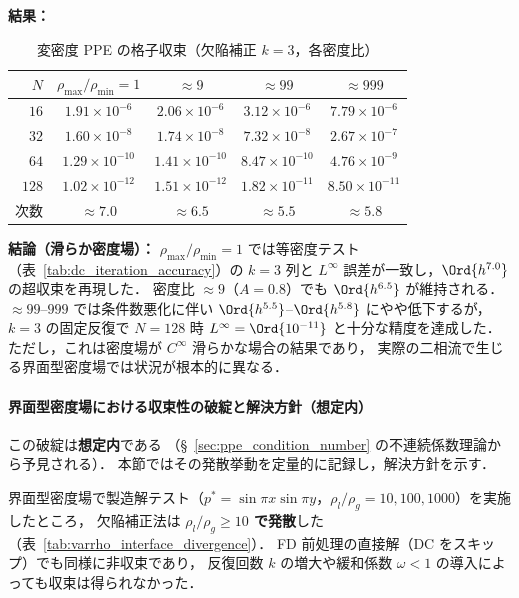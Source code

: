 \noindent\textbf{結果：}

\begin{table}[htbp]
\centering
\small
\caption{変密度 PPE の格子収束（欠陥補正 $k=3$，各密度比）}
\label{tab:ppe_varrho}
\renewcommand{\arraystretch}{1.3}
\begin{tabular}{rcccc}
\toprule
$N$ & $\rho_{\max}/\rho_{\min} = 1$ & $\approx 9$ & $\approx 99$ & $\approx 999$ \\
\midrule
$16$  & $1.91 \times 10^{-6}$ & $2.06 \times 10^{-6}$ & $3.12 \times 10^{-6}$ & $7.79 \times 10^{-6}$ \\
$32$  & $1.60 \times 10^{-8}$ & $1.74 \times 10^{-8}$ & $7.32 \times 10^{-8}$ & $2.67 \times 10^{-7}$ \\
$64$  & $1.29 \times 10^{-10}$ & $1.41 \times 10^{-10}$ & $8.47 \times 10^{-10}$ & $4.76 \times 10^{-9}$ \\
$128$ & $1.02 \times 10^{-12}$ & $1.51 \times 10^{-12}$ & $1.82 \times 10^{-11}$ & $8.50 \times 10^{-11}$ \\
\midrule
次数  & $\approx 7.0$ & $\approx 6.5$ & $\approx 5.5$ & $\approx 5.8$ \\
\bottomrule
\end{tabular}
\end{table}

\noindent\textbf{結論（滑らか密度場）：}
$\rho_{\max}/\rho_{\min} = 1$ では等密度テスト（表~\ref{tab:dc_iteration_accuracy}）の $k=3$ 列と
$L^\infty$ 誤差が一致し，$\Ord{h^{7.0}}$ の超収束を再現した．
密度比 $\approx 9$（$A = 0.8$）でも $\Ord{h^{6.5}}$ が維持される．
$\approx 99$--$999$ では条件数悪化に伴い $\Ord{h^{5.5}}$--$\Ord{h^{5.8}}$ にやや低下するが，
$k = 3$ の固定反復で $N = 128$ 時 $L^\infty = \Ord{10^{-11}}$ と十分な精度を達成した．
ただし，これは密度場が $C^\infty$ 滑らかな場合の結果であり，
実際の二相流で生じる界面型密度場では状況が根本的に異なる．

\paragraph{界面型密度場における収束性の破綻と解決方針（想定内）}
\label{sec:varrho_ppe_limitation}

この破綻は\textbf{想定内}である
（§~\ref{sec:ppe_condition_number} の不連続係数理論から予見される）．
本節ではその発散挙動を定量的に記録し，解決方針を示す．

界面型密度場で製造解テスト（$p^* = \sin\pi x\sin\pi y$，$\rho_l/\rho_g = 10, 100, 1000$）を実施したところ，
欠陥補正法は \textbf{$\rho_l/\rho_g \geq 10$ で発散}した（表~\ref{tab:varrho_interface_divergence}）．
FD 前処理の直接解（DC をスキップ）でも同様に非収束であり，
反復回数 $k$ の増大や緩和係数 $\omega < 1$ の導入によっても収束は得られなかった．


